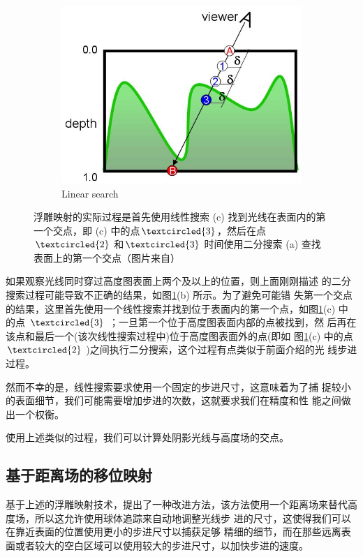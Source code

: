 \begin{figure}
\begin{fullwidth}
\begin{subfigure}[t]{.33\thewidth}
		\includegraphics[width=\textwidth]{graphics/df/relief-mapping3}
		\caption{Linear search}
	\end{subfigure}
	\caption{浮雕映射的实际过程是首先使用线性搜索 (c) 找到光线在表面内的第一个交点，即 (c) 中的点$\textcircled{3}$，然后在点$\textcircled{2}$ 和$\textcircled{3}$ 时间使用二分搜索 (a) 查找表面上的第一个交点（图片来自\cite{a:Real-TimeReliefMappingonArbitraryPolygonalSurfaces}）}
	\label{f:df-relief-mapping}
\end{fullwidth}
\end{figure}

如果观察光线同时穿过高度图表面上两个及以上的位置，则上面刚刚描述 的二分搜索过程可能导致不正确的结果，如图\ref{f:df-relief-mapping}(b) 所示。为了避免可能错 失第一个交点的结果，这里首先使用一个线性搜索并找到位于表面内的第一个点，如图\ref{f:df-relief-mapping}(c) 中的点 $\textcircled{3}$ ；一旦第一个位于高度图表面内部的点被找到，然 后再在该点和最后一个(该次线性搜索过程中)位于高度图表面外的点(即如 图\ref{f:df-relief-mapping}(c) 中的点 $\textcircled{2}$ )之间执行二分搜索，这个过程有点类似于前面介绍的光 线步进过程。

然而不幸的是，线性搜索要求使用一个固定的步进尺寸，这意味着为了捕 捉较小的表面细节，我们可能需要增加步进的次数，这就要求我们在精度和性 能之间做出一个权衡。

使用上述类似的过程，我们可以计算处阴影光线与高度场的交点。



\subsection{基于距离场的移位映射}
基于上述的浮雕映射技术，\cite{a:Per-PixelDisplacementMappingwithDistanceFunctions}提出了一种改进方法，该方法使用一个距离场来替代高度场，所以这允许使用球体追踪来自动地调整光线步 进的尺寸，这使得我们可以在靠近表面的位置使用更小的步进尺寸以捕获足够 精细的细节，而在那些远离表面或者较大的空白区域可以使用较大的步进尺寸，以加快步进的速度。

